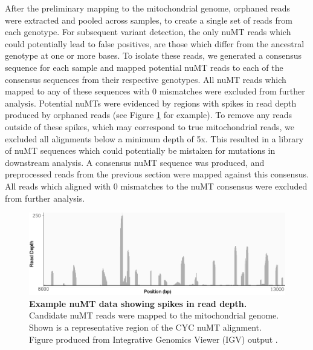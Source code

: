 \documentclass[12pt,twoside]{reedthesis}
\begin{document}
After the preliminary mapping to the mitochondrial genome, orphaned reads were extracted and pooled across samples, to create a single set of reads from each genotype.
For subsequent variant detection, the only nuMT reads which could potentially lead to false positives, are those which differ from the ancestral genotype at one or more bases. 
To isolate these reads, we generated a consensus sequence for each sample and mapped potential nuMT reads to each of the consensus sequences from their respective genotypes.
All nuMT reads which mapped to any of these sequences with 0 mismatches were excluded from further analysis.
Potential nuMTs were evidenced by regions with spikes in read depth produced by orphaned reads (see Figure \ref{numt_example} for example).
To remove any reads outside of these spikes, which may correspond to true mitochondrial reads, we excluded all alignments below a minimum depth of 5x. 
This resulted in a library of nuMT sequences which could potentially be mistaken for mutations in downstream analysis.
A consensus nuMT sequence was produced, and preprocessed reads from the previous section were mapped against this consensus.
All reads which aligned with 0 mismatches to the nuMT consensus were excluded from further analysis.

\begin{figure}[h]
        \begin{center}
            \includegraphics[width=1\textwidth]{../figures/igv_panel.png}
        \end{center}
        \caption[Example nuMT Data showing spikes in read depth]{\textbf{Example nuMT data showing spikes in read depth.} Candidate nuMT reads were mapped to the mitochondrial genome. Shown is a representative region of the CYC nuMT alignment. Figure produced from Integrative Genomics Viewer (IGV) output \citep{robinson_integrative_2011}.}
    \label{numt_example}
\end{figure}
\end{document}
